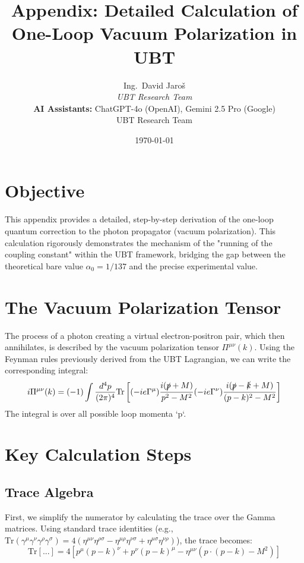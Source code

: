 \documentclass[12pt, a4paper]{article}
\title{\textbf{Appendix: Detailed Calculation of One-Loop Vacuum Polarization in UBT}}
\author{
Ing.~David Jaroš \\
\textit{UBT Research Team} \\
\textbf{AI Assistants:} ChatGPT-4o (OpenAI), Gemini 2.5 Pro (Google) \\
UBT Research Team}
\date{\today}
\begin{document}
\maketitle

\section{Objective}
This appendix provides a detailed, step-by-step derivation of the one-loop quantum correction to the photon propagator (vacuum polarization). This calculation rigorously demonstrates the mechanism of the "running of the coupling constant" within the UBT framework, bridging the gap between the theoretical bare value \( \alpha_0 = 1/137 \) and the precise experimental value.

\section{The Vacuum Polarization Tensor}
The process of a photon creating a virtual electron-positron pair, which then annihilates, is described by the vacuum polarization tensor \( \Pi^{\mu\nu}(k) \). Using the Feynman rules previously derived from the UBT Lagrangian, we can write the corresponding integral:
\begin{equation}
    i\Pi^{\mu\nu}(k) = (-1) \int \frac{d^4p}{(2\pi)^4} \text{Tr} \left[ (-ie\Gamma^\mu) \frac{i(\slashed{p} + M)}{p^2 - M^2} (-ie\Gamma^\nu) \frac{i(\slashed{p} - \slashed{k} + M)}{(p-k)^2 - M^2} \right]
    \label{eq:integral}
\end{equation}
The integral is over all possible loop momenta `p`.

\section{Key Calculation Steps}

\subsection{Trace Algebra}
First, we simplify the numerator by calculating the trace over the Gamma matrices. Using standard trace identities (e.g., \( \text{Tr}(\gamma^\mu \gamma^\nu \gamma^\rho \gamma^\sigma) = 4(\eta^{\mu\nu}\eta^{\rho\sigma} - \eta^{\mu\rho}\eta^{\nu\sigma} + \eta^{\mu\sigma}\eta^{\nu\rho}) \)), the trace becomes:
\begin{equation}
    \text{Tr}[...] = 4 \left[ p^\mu(p-k)^\nu + p^\nu(p-k)^\mu - \eta^{\mu\nu}(p \cdot (p-k) - M^2) \right]
\end{equation}
\end{document}
